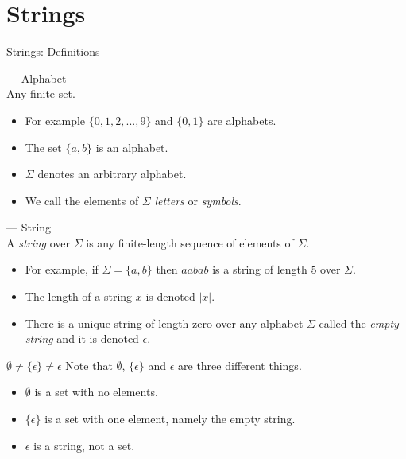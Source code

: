 \section[slide=true,tocsection=false]{Strings}
\begin{slide}[bm=,toc=]{Strings: Definitions}
\pause
\begin{defn}{--- Alphabet}~\\
\pause Any finite set. 
\end{defn}
\vspace{-5mm}
\begin{itemize}
\item<4-> For example $\{0,1,2,...,9\}$ and $\{0,1\}$ are alphabets. 
\item<5-> The set $\{a,b\}$ is an alphabet. 
\item<6->  $\Sigma$ denotes an arbitrary alphabet. 
\item<7->  We call the elements of $\Sigma$ \emph{letters} or \emph{symbols}.
\end{itemize}
\pause[5]
\begin{defn}{--- String}~\\
\pause
A \emph{string} over $\Sigma$ is any finite-length sequence of elements of
$\Sigma$. 
\end{defn}
\vspace{-5mm}

\begin{itemize}
\item<10-> For example, if $\Sigma = \{a,b\}$ then $aabab$ is a string of length $5$ over $\Sigma$.
\item<11-> The length of a string $x$ is denoted $|x|$. 
\item<12-> There is a unique string of length zero over any alphabet $\Sigma$ called
      the \emph{empty string} and it is denoted $\epsilon$.
\end{itemize}
\end{slide}

\begin{slide}[bm=,toc=]{$\emptyset \neq \{\epsilon\} \neq \epsilon$}
    Note that $\emptyset$, $\{\epsilon\}$ and $\epsilon$ are three different things.
    \begin{itemize}
    \item<2-> $\emptyset$ is a set with no elements.
    \item<3-> $\{\epsilon\}$ is a set with one element, namely the empty string.
    \item<4-> $\epsilon$ is a string, not a set.
    \end{itemize}
\end{slide}

